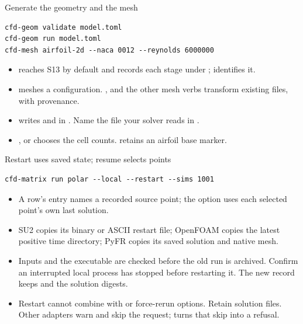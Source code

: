 \begin{frame}[fragile]{Generate the geometry and the mesh}
\begin{lstlisting}
cfd-geom validate model.toml
cfd-geom run model.toml
cfd-mesh airfoil-2d --naca 0012 --reynolds 6000000
\end{lstlisting}
\begin{itemize}\small
  \item {} reaches S13 by default and records each stage under
        ;  identifies it.
  \item {} meshes a configuration. , 
        and the other mesh verbs transform existing files, with provenance.
  \item {} writes  and 
        in . Name the file your solver reads in .
  \item {},  or  chooses the cell
        counts.  retains an airfoil base marker.
\end{itemize}
\end{frame}

\begin{frame}[fragile]{Restart uses saved state; resume selects points}
\begin{lstlisting}
cfd-matrix run polar --local --restart --sims 1001
\end{lstlisting}
\begin{itemize}\small
  \item A row's  entry names a recorded source point; the
         option uses each selected point's own last solution.
  \item SU2 copies its binary or ASCII restart file; OpenFOAM copies the latest
        positive time directory; PyFR copies its saved solution and native mesh.
  \item Inputs and the executable are checked before the old run is archived.
        Confirm an interrupted local process has stopped before restarting it.
        The new record keeps  and the solution digests.
  \item Restart cannot combine with  or force-rerun options.
        Retain solution files. Other adapters warn and skip the request;
         turns that skip into a refusal.
\end{itemize}
\end{frame}
